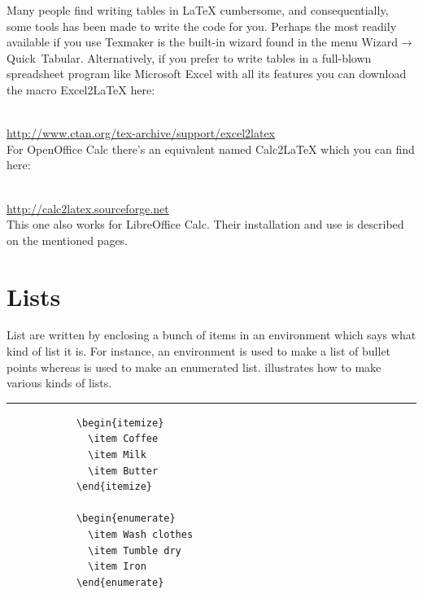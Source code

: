 {Many people find writing tables in \LaTeX{} cumbersome, and consequentially, some tools has been made to write the code for you. Perhaps the most readily available if you use Texmaker is the built-in wizard found in the menu Wizard$\rightarrow$Quick~Tabular. Alternatively, if you prefer to write tables in a full-blown spreadsheet program like Microsoft Excel with all its features you can download the macro Excel2LaTeX here:

~\\
\url{http://www.ctan.org/tex-archive/support/excel2latex} \\

\noindent For OpenOffice Calc there's an equivalent named Calc2LaTeX which you can find here:

~\\
\url{http://calc2latex.sourceforge.net} \\

\noindent This one also works for LibreOffice Calc. Their installation and use is described on the mentioned pages.

\section{Lists}
List are written by enclosing a bunch of items in an environment which says what kind of list it is. For instance, an  environment is used to make a list of bullet points whereas  is used to make an enumerated list.  illustrates how to make various kinds of lists.

\begin{listing}
	\rule{\textwidth}{0.4pt}
	\begin{minipage}[t]{0.49\textwidth}
		\begin{verbatim}
			\begin{itemize}
			  \item Coffee
			  \item Milk
			  \item Butter
			\end{itemize}

			\begin{enumerate}
			  \item Wash clothes
			  \item Tumble dry
			  \item Iron
			\end{enumerate}		


\end{verbatim}
\end{minipage}
\end{listing}}
